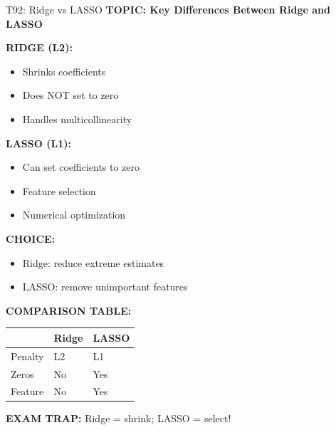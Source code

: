 \documentclass[8pt]{beamer}
\begin{document}
	\begin{frame}{T92: Ridge vs LASSO}
		\fontsize{6.5}{7.5}\selectfont
		\textbf{TOPIC: Key Differences Between Ridge and LASSO}
		
		\vspace{0.1cm}
		\textbf{RIDGE (L2):}
		\begin{itemize}
			\item Shrinks coefficients
			\item Does NOT set to zero
			\item Handles multicollinearity
		\end{itemize}
		
		\vspace{0.1cm}
		\textbf{LASSO (L1):}
		\begin{itemize}
			\item Can set coefficients to zero
			\item Feature selection
			\item Numerical optimization
		\end{itemize}
		
		\vspace{0.1cm}
		\textbf{CHOICE:}
		\begin{itemize}
			\item Ridge: reduce extreme estimates
			\item LASSO: remove unimportant features
		\end{itemize}
		
		\vspace{0.1cm}
		\textbf{COMPARISON TABLE:}
		\begin{tabular}{|p{2cm}|p{2cm}|p{2cm}|}
			\hline
			& Ridge & LASSO \\
			\hline
			Penalty & L2 & L1 \\
			\hline
			Zeros & No & Yes \\
			\hline
			Feature & No & Yes \\
			\hline
		\end{tabular}
		
		\textcolor{myred}{\textbf{EXAM TRAP:}} Ridge = \textcolor{myblue}{shrink}; LASSO = \textcolor{myblue}{select}!
	\end{frame}
	
\end{document}

